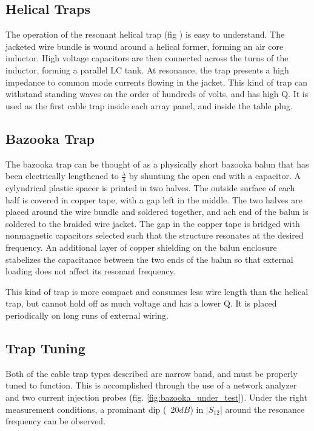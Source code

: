 \subsection{Helical Traps}
The operation of the resonant helical trap (fig \cite{helical_trap}) is easy to understand.  The jacketed wire bundle is
wound around a helical former, forming an air core inductor. High voltage capacitors are then connected across the turns
of the inductor, forming a parallel LC tank. At resonance, the trap presents a high impedance to common mode currents flowing in the jacket. 
This kind of trap can withstand standing waves on the order of hundreds of volts, and has high Q. It is used as the first cable trap inside each array panel, and inside the table plug.

\subsection{Bazooka Trap}
The bazooka trap can be thought of as a physically short bazooka balun that has been electrically lengthened to $\frac{\lambda}{4}$ by shuntung the open end with a capacitor. A cylyndrical plastic spacer is printed in two halves. The outside surface of each half is covered in copper tape, with a gap left in the middle. The two halves are placed around the wire bundle and soldered together, and ach end of the balun is soldered to the braided wire jacket. The gap in the copper tape is bridged with nonmagnetic capacitors selected such that the structure resonates at the desired frequency. An additional layer of copper shielding on the balun enclosure stabelizes the capacitance between the two ends of the balun so that external loading does not affect its resonant frequency.

This kind of trap is more compact and consumes less wire length than the helical trap, but cannot hold off as much voltage and has a lower Q.  It is placed periodically on long runs of external wiring.

\subsection{Trap Tuning}
Both of the cable trap types described are narrow band, and must be properly tuned to function. This is accomplished
through the use of a network analyzer and two current injection probes (fig. \ref{fig:bazooka_under_test}). Under the
right measurement conditions, a prominant dip (~$20dB$) in $|S_{12}|$ around the resonance frequency can be observed.
